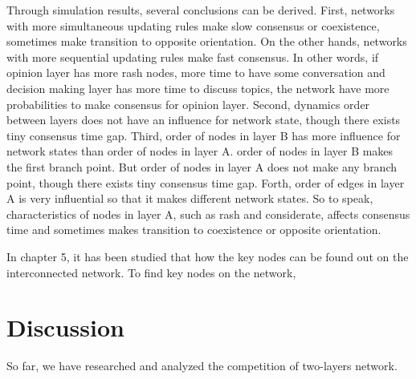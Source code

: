 Through simulation results, several conclusions can be derived. First, networks with more simultaneous updating rules make slow consensus or coexistence, sometimes make transition to opposite orientation. On the other hands, networks with more sequential updating rules make fast consensus. In other words, if opinion layer has more rash nodes, more time to have some conversation and decision making layer has more time to  discuss topics, the network have more probabilities to make consensus for opinion layer. Second, dynamics order between layers does not have an influence for network state, though there exists tiny consensus time gap. Third, order of nodes in layer B has more influence for network states than order of nodes in layer A. order of nodes in layer B makes the first branch point. But order of nodes in layer A does not make any branch point, though there exists tiny consensus time gap. Forth, order of edges in layer A is very influential so that it makes different network states. So to speak, characteristics of nodes in layer A, such as rash and considerate, affects consensus time and sometimes makes transition to coexistence or opposite orientation. 



In chapter 5, it has been studied that how the key nodes can be found out on the interconnected network. To find key nodes on the network, 

\section{Discussion} 

So far, we have researched and analyzed the competition of two-layers network. 